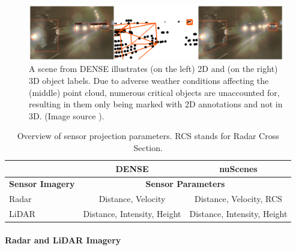 \documentclass[report.tex]{subfiles}
\begin{document}
    \begin{figure}[h]
        \centering
        \includegraphics[width=1.0\textwidth]{images/methods/hrfuser/2d vs 3d annotations.png}
        \caption{A scene from DENSE \cite{bijelic2020seeing} illustrates (on the left) 2D and (on the right) 3D object labels. Due to adverse weather conditions affecting the (middle) point cloud, numerous critical objects are unaccounted for, resulting in them only being marked with 2D annotations and not in 3D. (Image source \cite{broedermann2022hrfuser}).}
        \label{fig:hrfuser_2d_vs_3d_annotations}
    \end{figure}

    \begin{table}[h]
        \centering
        \caption{Overview of sensor projection parameters. RCS stands for Radar Cross Section.}
        \begin{tabular}{|l|c|c|}
        \hline
        \cline{2-3}
               & DENSE           & nuScenes                        \\
        \hline
        \textbf{Sensor Imagery} & \multicolumn{2}{c|}{\textbf{Sensor Parameters}} \\
        \hline
        Radar & Distance, Velocity & Distance, Velocity, RCS \\
        \hline
        LiDAR & Distance, Intensity, Height & Distance, Intensity, Height \\
        \hline
        \end{tabular}
        \label{tab:sensor_projection_parameters}
    \end{table}

    \paragraph*{Radar and LiDAR Imagery}
\end{document}
